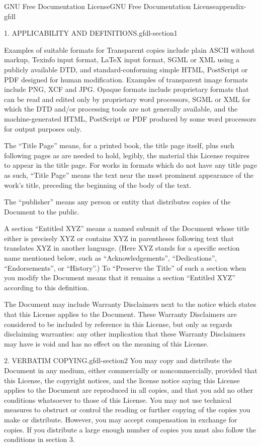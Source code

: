 \documentclass[oneside,10pt,]{book}
\numberwithin{equation}{section}
\begin{document}
\begin{appendixptx}{GNU Free Documentation License}{}{GNU Free Documentation License}{}{}{appendix-gfdl}
\begin{paragraphs}{1. APPLICABILITY AND DEFINITIONS.}{gfdl-section1}
\par
\hypertarget{p-711}{}%
Examples of suitable formats for Transparent copies include plain ASCII without markup, Texinfo input format, LaTeX input format, SGML or XML using a publicly available DTD, and standard-conforming simple HTML, PostScript or PDF designed for human modification. Examples of transparent image formats include PNG, XCF and JPG. Opaque formats include proprietary formats that can be read and edited only by proprietary word processors, SGML or XML for which the DTD and\slash{}or processing tools are not generally available, and the machine-generated HTML, PostScript or PDF produced by some word processors for output purposes only.%
\par
\hypertarget{p-712}{}%
The ``Title Page'' means, for a printed book, the title page itself, plus such following pages as are needed to hold, legibly, the material this License requires to appear in the title page. For works in formats which do not have any title page as such, ``Title Page'' means the text near the most prominent appearance of the work's title, preceding the beginning of the body of the text.%
\par
\hypertarget{p-713}{}%
The ``publisher'' means any person or entity that distributes copies of the Document to the public.%
\par
\hypertarget{p-714}{}%
A section ``Entitled XYZ'' means a named subunit of the Document whose title either is precisely XYZ or contains XYZ in parentheses following text that translates XYZ in another language. (Here XYZ stands for a specific section name mentioned below, such as ``Acknowledgements'', ``Dedications'', ``Endorsements'', or ``History''.) To ``Preserve the Title'' of such a section when you modify the Document means that it remains a section ``Entitled XYZ'' according to this definition.%
\par
\hypertarget{p-715}{}%
The Document may include Warranty Disclaimers next to the notice which states that this License applies to the Document. These Warranty Disclaimers are considered to be included by reference in this License, but only as regards disclaiming warranties: any other implication that these Warranty Disclaimers may have is void and has no effect on the meaning of this License.%
\end{paragraphs}%
\begin{paragraphs}{2. VERBATIM COPYING.}{gfdl-section2}%
\hypertarget{p-716}{}%
You may copy and distribute the Document in any medium, either commercially or noncommercially, provided that this License, the copyright notices, and the license notice saying this License applies to the Document are reproduced in all copies, and that you add no other conditions whatsoever to those of this License. You may not use technical measures to obstruct or control the reading or further copying of the copies you make or distribute. However, you may accept compensation in exchange for copies. If you distribute a large enough number of copies you must also follow the conditions in section 3.%

\end{paragraphs}
\end{appendixptx}
\end{document}
